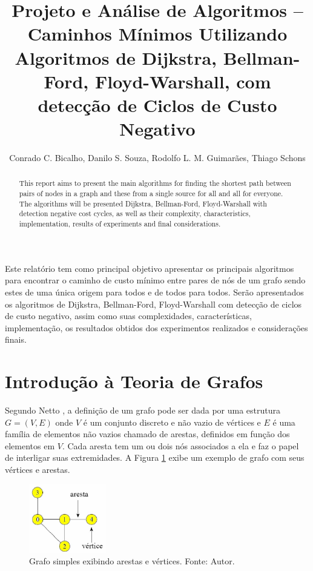 \documentclass[12pt]{article}
\title{Projeto e Análise de Algoritmos -- \\ Caminhos Mínimos Utilizando Algoritmos de Dijkstra, Bellman-Ford, Floyd-Warshall, com detecção de Ciclos de Custo Negativo}
\author{Conrado C. Bicalho, Danilo S. Souza, Rodolfo L. M. Guimarães, Thiago Schons}
\begin{document}
 

\maketitle

\begin{abstract}
This report aims to present the main algorithms for finding the shortest path between pairs of nodes in a graph and these from a single source for all and all for everyone. The algorithms will be presented Dijkstra, Bellman-Ford, Floyd-Warshall with detection negative cost cycles, as well as their complexity, characteristics, implementation, results of experiments and final considerations.
\end{abstract}
     
\begin{resumo} 
Este relatório tem como principal objetivo apresentar os principais algoritmos para encontrar o caminho de custo mínimo entre pares de nós de um grafo sendo estes de uma única origem para todos e de todos para todos. Serão apresentados os algoritmos de Dijkstra, Bellman-Ford, Floyd-Warshall com detecção de ciclos de custo negativo, assim como suas complexidades, características, implementação, os resultados obtidos dos experimentos realizados e considerações finais.
\end{resumo}



\section{Introdução à Teoria de Grafos}

Segundo Netto \cite{netto2003grafos}, a definição de um grafo pode ser dada por uma estrutura $G=(V,E)$ onde $V$ é um conjunto discreto e não vazio de vértices e $E$ é uma família de elementos não vazios chamado de arestas, definidos em função dos elementos em $V$. Cada aresta tem um ou dois nós associados a ela e faz o papel de interligar suas extremidades. A Figura \ref{fig:naoponderado} exibe um exemplo de grafo com seus vértices e arestas.

\begin{figure}[H]
  \centering
    \includegraphics[width=0.3\textwidth]{img/naoponderado.jpg}
  \caption{Grafo simples exibindo arestas e vértices. Fonte: Autor.}
  \label{fig:naoponderado}
\end{figure}
\end{document}
